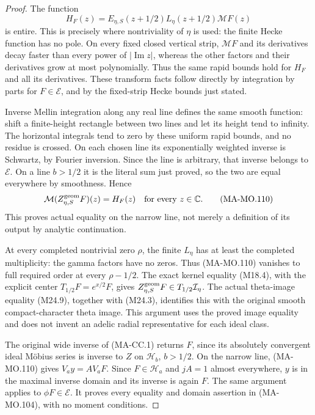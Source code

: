 \begin{proof}
The function
\[
 H_F(z)=E_{\eta,S}(z+1/2)L_\eta(z+1/2)\mathcal MF(z)
 \tag{MA-MO.109}
\]
is entire. This is precisely where nontriviality of
\(\eta\) is used: the finite Hecke function has no pole.
On every fixed closed vertical strip, \(\mathcal MF\)
and its derivatives decay faster than every power of
\(|\operatorname{Im}z|\), whereas the other factors and
their derivatives grow at most polynomially. Thus the
same rapid bounds hold for \(H_F\) and all its derivatives.
These transform facts follow directly by integration by
parts for \(F\in\mathcal E\), and by the fixed-strip
Hecke bounds just stated.

Inverse Mellin integration along any real line defines
the same smooth function: shift a finite-height rectangle
between two lines and let its height tend to infinity.
The horizontal integrals tend to zero by these uniform
rapid bounds, and no residue is crossed. On each chosen
line its exponentially weighted inverse is Schwartz,
by Fourier inversion. Since the line is arbitrary, that
inverse belongs to \(\mathcal E\). On a line \(b>1/2\)
it is the literal sum just proved, so the two are equal
everywhere by smoothness. Hence
\[
 \mathcal M(Z_{\eta,S}^{\rm geom}F)(z)=H_F(z)
                         \quad\hbox{for every }z\in\mathbb C.
 \tag{MA-MO.110}
\]
This proves actual equality on the narrow line, not merely
a definition of its output by analytic continuation.

At every completed nontrivial zero \(\rho\), the finite
\(L_\eta\) has at least the completed multiplicity: the
gamma factors have no zeros. Thus (MA-MO.110) vanishes to
full required order at every \(\rho-1/2\). The exact
kernel equality (M18.4), with the explicit center
\(T_{1/2}F=e^{x/2}F\), gives
\(Z_{\eta,S}^{\rm geom}F\in T_{1/2}\mathcal I_\eta\).
The actual theta-image equality (M24.9), together with
(M24.3), identifies this with the original smooth
compact-character theta image. This argument uses the
proved image equality and does not invent an adelic
radial representative for each ideal class.

The original wide inverse of (MA-CC.1) returns \(F\),
since its absolutely convergent ideal M\"obius series is
inverse to \(Z\) on \(\mathcal H_b\), \(b>1/2\).
On the narrow line, (MA-MO.110) gives
\(V_ay=A V_aF\). Since \(F\in\mathcal H_a\) and
\(jA=1\) almost everywhere, \(y\) is in the maximal
inverse domain and its inverse is again \(F\).
The same argument applies to \(\phi F\in\mathcal E\).
It proves every equality and domain assertion in
(MA-MO.104), with no moment conditions.


\end{proof}
